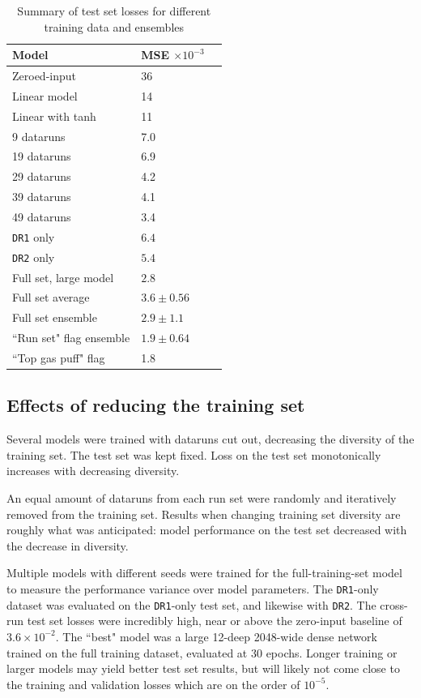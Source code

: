 \begin{table}
	\small
	\centering
	\caption{Summary of test set losses for different training data and ensembles}
	\label{tab:loss_summary}
	\begin{tabular}{l l l}
		Model & MSE $\times 10^{-3}$ \\
		\hline
		Zeroed-input & 36 \\
		Linear model & 14 \\
		Linear with tanh & 11 \\
		\hline
		9 dataruns & 7.0\\
		19 dataruns & 6.9 \\
		29 dataruns & 4.2 \\
		39 dataruns & 4.1 \\ 
		49 dataruns & 3.4 \\
		\texttt{DR1} only & $6.4$ \\
		\texttt{DR2} only & $5.4$ \\
		Full set, large model & $2.8$ \\
		Full set average & $3.6 \pm 0.56$ \\
		Full set ensemble & $2.9 \pm 1.1$ \\
		\hline
		``Run set" flag ensemble & $1.9 \pm 0.64$ \\
		``Top gas puff" flag & 1.8 \\
		
	\end{tabular}
\end{table}

\subsection{Effects of reducing the training set}

Several models were trained with dataruns cut out, decreasing the diversity of the training set. The test set was kept fixed. Loss on the test set monotonically increases with decreasing diversity. 

An equal amount of dataruns from each run set were randomly and iteratively removed from the training set. Results when changing training set diversity are roughly what was anticipated: model performance on the test set decreased with the decrease in diversity. 

Multiple models with different seeds were trained for the full-training-set model to measure the performance variance over model parameters. The \texttt{DR1}-only dataset was evaluated on the \texttt{DR1}-only test set, and likewise with \texttt{DR2}. The cross-run test set losses were incredibly high, near or above the zero-input baseline of $3.6 \times 10^{-2}$. The ``best" model was a large 12-deep 2048-wide dense network trained on the full training dataset, evaluated at 30 epochs. Longer training or larger models may yield better test set results, but will likely not come close to the training and validation losses which are on the order of $10^{-5}$. 

